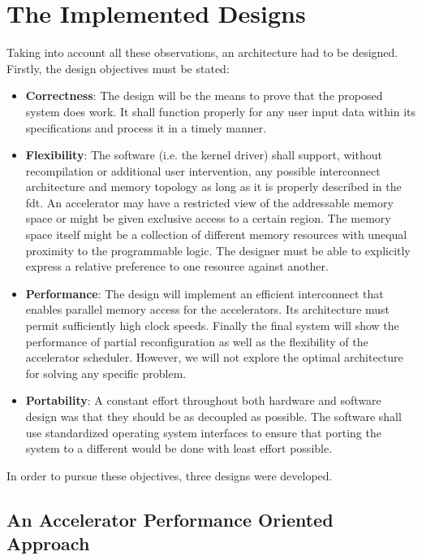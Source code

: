 \section{The Implemented Designs}

Taking into account all these observations, an architecture had to be designed.
Firstly, the design objectives must be stated:

\begin{itemize}
\item	\textbf{Correctness}:
	The design will be the means to prove that the proposed system does work.
	It shall function properly for any user input data within its specifications
	and process it in a timely manner.
\item	\textbf{Flexibility}:
	The software (i.e. the kernel driver) shall support,
	without recompilation or additional user intervention,
	any possible interconnect architecture and memory topology
	as long as it is properly described in the \gls{fdt}.
	An accelerator may have a restricted view of the addressable memory space
	or might be given exclusive access to a certain region.
	The memory space itself might be a collection of different memory resources
	with unequal proximity to the programmable logic.
	The designer must be able to explicitly express a relative preference
	to one resource against another.
\item	\textbf{Performance}:
	The design will implement an efficient interconnect that enables
	parallel memory access for the accelerators.
	Its architecture must permit sufficiently high clock speeds.
	Finally the final system will show the performance of partial reconfiguration
	as well as the flexibility of the accelerator scheduler.
	However, we will not explore the optimal architecture for solving any specific problem.
\item	\textbf{Portability}:
	A constant effort throughout both hardware and software design was that they should be
	as decoupled as possible. The software shall use standardized operating system
	interfaces to ensure that porting the system to a different would be done with
	least effort possible.
\end{itemize}

In order to pursue these objectives, three designs were developed.

\subsection{An Accelerator Performance Oriented Approach}

